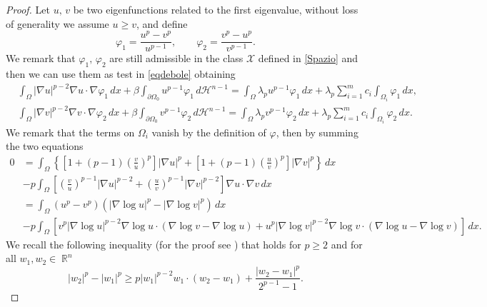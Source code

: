 \documentclass[12pt]{article}
\newcommand{\abs}[1]{{\left|#1\right|}}
\newcommand{\dH}{d\mathcal{H}^{n-1}}
\theoremstyle{definition}
\theoremstyle{plain}
\theoremstyle{definition}
\DeclareMathOperator{\R}{\mathbb{R}}
\begin{document}
\begin{proof}
    Let $u,\,v$ be two eigenfunctions related to the first eigenvalue, without loss of generality we assume $u\geq v$, and define
    \begin{equation*}
        \varphi_1=\frac{u^p-v^p}{u^{p-1}},\qquad\varphi_2=\frac{v^p-u^p}{v^{p-1}}.
    \end{equation*}
    We remark that $\varphi_1,\,\varphi_2$ are still admissible in the class $\mathcal{X}$ defined in \eqref{Spazio} and then we can use them as test in \eqref{eqdebole} obtaining
    \begin{equation*}
        \begin{split}
            &\int_{\Omega}\abs{\nabla u}^{p-2}\nabla u\cdot\nabla\varphi_1\,dx+\beta\int_{\partial\Omega_0}u^{p-1}\varphi_1\,\dH=\int_\Omega\lambda_p u^{p-1}\varphi_1\,dx+\lambda_p\sum_{i=1}^m c_i\int_{\Omega_i} \varphi_1\,dx,\\
            &\int_{\Omega}\abs{\nabla v}^{p-2}\nabla v\cdot\nabla\varphi_2\,dx+\beta\int_{\partial\Omega_0}v^{p-1}\varphi_2\,\dH=\int_\Omega\lambda_p v^{p-1}\varphi_2\,dx+\lambda_p\sum_{i=1}^m c_i\int_{\Omega_i} \varphi_2\,dx.
        \end{split}
    \end{equation*}
    We remark that the terms on $\Omega_i$ vanish by the definition of $\varphi$, then by summing the two equations
    \begin{equation}\label{IdUtile}
        \begin{split}
            0&=\int_\Omega\left\{\left[1+(p-1)\left(\frac{v}{u}\right)^p\right]\abs{\nabla u}^p+\left[1+(p-1)\left(\frac{u}{v}\right)^p\right]\abs{\nabla v}^p\right\}\,dx\\ &-p\int_\Omega\left[\left(\frac{v}{u}\right)^{p-1}\abs{\nabla u}^{p-2}+\left(\frac{u}{v}\right)^{p-1}\abs{\nabla v}^{p-2}\right]\nabla u\cdot\nabla v\,dx\\&=\int_\Omega(u^p-v^p)(\abs{\nabla\log u}^p-\abs{\nabla\log v}^p)\,dx\\&-p\int_\Omega\left[v^p\abs{\nabla\log u}^{p-2}\nabla\log u\cdot(\nabla\log v-\nabla\log u)+u^p\abs{\nabla\log v}^{p-2}\nabla\log v\cdot(\nabla\log u-\nabla\log v)\right]\,dx.
        \end{split}
    \end{equation}
    We recall the following inequality (for the proof see \cite{L}) that holds for $p\geq2$ and for all $w_1,w_2\in\R^n$
    \begin{equation}\label{DisUtile}
        \abs{w_2}^p-\abs{w_1}^p\geq p\abs{w_1}^{p-2}w_1\cdot(w_2-w_1)+\frac{\abs{w_2-w_1}^p}{2^{p-1}-1}.

\end{equation}
\end{proof}
\end{document}
